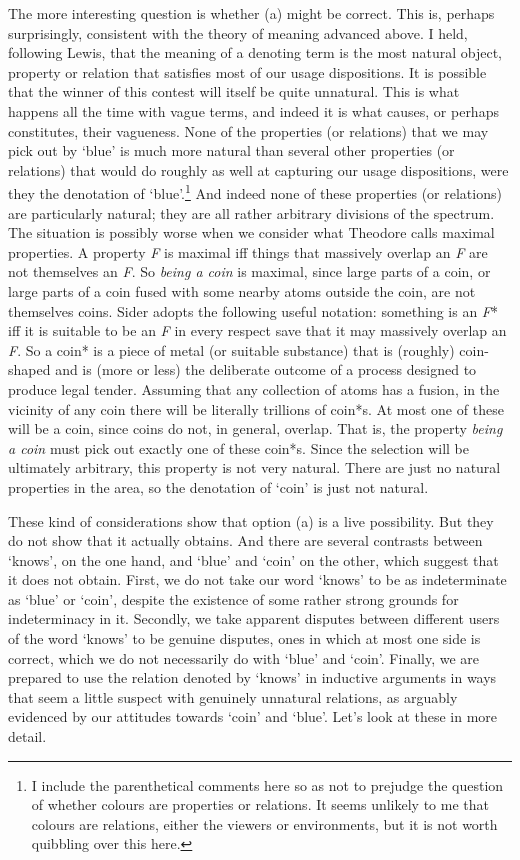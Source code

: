 The more interesting question is whether (a) might be correct. This is, perhaps surprisingly, consistent with the theory of meaning advanced above. I held, following Lewis, that the meaning of a denoting term is the most natural object, property or relation that satisfies most of our usage dispositions. It is possible that the winner of this contest will itself be quite unnatural. This is what happens all the time with vague terms, and indeed it is what causes, or perhaps constitutes, their vagueness. None of the properties (or relations) that we may pick out by `blue' is much more natural than several other properties (or relations) that would do roughly as well at capturing our usage dispositions, were they the denotation of `blue'.\footnote{I include the parenthetical comments here so as not to prejudge the question of whether colours are properties or relations. It seems unlikely to me that colours are relations, either the viewers or environments, but it is not worth quibbling over this here.} And indeed none of these properties (or relations) are particularly natural; they are all rather arbitrary divisions of the spectrum. The situation is possibly worse when we consider what Theodore \citet{Sider2001-SIDMAI} calls maximal properties. A property \textit{F} is maximal iff things that massively overlap an \textit{F} are not themselves an \textit{F}. So \textit{being a coin} is maximal, since large parts of a coin, or large parts of a coin fused with some nearby atoms outside the coin, are not themselves coins. Sider adopts the following useful notation: something is an \textit{F}* iff it is suitable to be an \textit{F} in every respect save that it may massively overlap an \textit{F}. So a coin* is a piece of metal (or suitable substance) that is (roughly) coin-shaped and is (more or less) the deliberate outcome of a process designed to produce legal tender. Assuming that any collection of atoms has a fusion, in the vicinity of any coin there will be literally trillions of coin*s. At most one of these will be a coin, since coins do not, in general, overlap. That is, the property \textit{being a coin} must pick out exactly one of these coin*s. Since the selection will be ultimately arbitrary, this property is not very natural. There are just no natural properties in the area, so the denotation of `coin' is just not natural.

These kind of considerations show that option (a) is a live possibility. But they do not show that it actually obtains. And there are several contrasts between `knows', on the one hand, and `blue' and `coin' on the other, which suggest that it does not obtain. First, we do not take our word `knows' to be as indeterminate as `blue' or `coin', despite the existence of some rather strong grounds for indeterminacy in it. Secondly, we take apparent disputes between different users of the word `knows' to be genuine disputes, ones in which at most one side is correct, which we do not necessarily do with `blue' and `coin'. Finally, we are prepared to use the relation denoted by `knows' in inductive arguments in ways that seem a little suspect with genuinely unnatural relations, as arguably evidenced by our attitudes towards `coin' and `blue'. Let's look at these in more detail.

